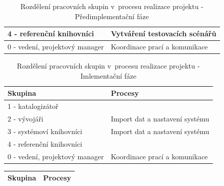 \documentclass[
	11pt, oneside, printed, final, palatino, monochrome
	microtype,
	table,   %
	lof,     %
	lot     %
]{fithesis3}
\newcommand{\bold}[1]{\textbf{#1}}
\begin{document}
{\begin{table}
\begin{tabular}{| p{3cm} | p{8.3cm} |}
	4 - referenční knihovníci
    & 
    Vytváření testovacích scénářů
    \\ \hline
    
	0 - vedení, projektový manager
    & 
    Koordinace prací a komunikace
    \\ \hline
    
    \end{tabular}
    \caption{Rozdělení pracovních skupin v~procesu realizace projektu - Předimplementační fáze}
\end{table}
    
\begin{table}
    \centering
    \begin{tabular}{| p{3cm} | p{8.3cm} |}
    \hline
    \bold{Skupina} 	
    & 
    \bold{Procesy} 
    \\ \hline
    
	1 - katalogizátoř
    & 
    
    \\ \hline
    
	2 - vývojáři
    & 
    Import dat a nastavení systému
    \\ \hline
    
	3 - systémoví knihovníci
    & 
    Import dat a nastavení systému
    \\ \hline
    
	4 - referenční knihovníci
    & 
    
    \\ \hline
    
	0 - vedení, projektový manager
    & 
    Koordinace prací a komunikace
    \\ \hline
    
    \end{tabular}
    \caption{Rozdělení pracovních skupin v~procesu realizace projektu - Imlementační fáze}
\end{table}

\begin{table}
    \centering
    \begin{tabular}{| p{3cm} | p{8.3cm} |}
    \hline
    \bold{Skupina} 	
    & 
    \bold{Procesy} 
    \\ \hline
    

\end{tabular}
\end{table}}
\end{document}

